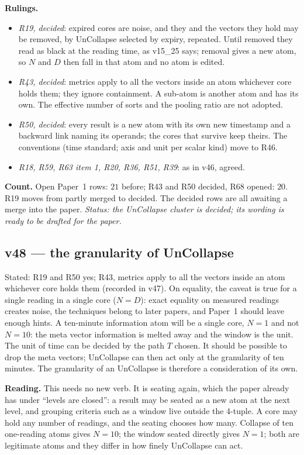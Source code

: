 \documentclass[11pt]{article}
\begin{document}
\textbf{Rulings.}
\begin{itemize}
\item \emph{R19, decided}: expired cores are noise, and they and the vectors they hold may be removed, by UnCollapse selected by expiry, repeated. Until removed they read as black at the reading time, as v15\_25 says; removal gives a new atom, so $N$ and $D$ then fall in that atom and no atom is edited.
\item \emph{R43, decided}: metrics apply to all the vectors inside an atom whichever core holds them; they ignore containment. A sub-atom is another atom and has its own. The effective number of sorts and the pooling ratio are not adopted.
\item \emph{R50, decided}: every result is a new atom with its own new timestamp and a backward link naming its operands; the cores that survive keep theirs. The conventions (time standard; axis and unit per scalar kind) move to R46.
\item \emph{R18, R59, R63 item 1, R20, R36, R51, R39}: as in v46, agreed.
\end{itemize}
\textbf{Count.} Open Paper~1 rows: $21$ before; R43 and R50 decided, R68 opened: $20$. R19 moves from partly merged to decided. The decided rows are all awaiting a merge into the paper.
\emph{Status: the UnCollapse cluster is decided; its wording is ready to be drafted for the paper.}


\subsection*{v48 --- the granularity of UnCollapse}
Stated: R19 and R50 yes; R43, metrics apply to all the vectors inside an atom whichever core holds them (recorded in v47). On equality, the caveat is true for a single reading in a single core ($N=D$): exact
equality on measured readings creates noise, the techniques belong to later papers, and Paper~1 should leave enough hints. A ten-minute information atom will be a single core, $N=1$ and not $N=10$: the
meta vector information is melted away and the window is the unit. The unit of time can be decided by the path $T$ chosen. It should be possible to drop the meta vectors; UnCollapse can then act only at the granularity of ten minutes. The granularity of an UnCollapse is therefore a consideration of its own.

\textbf{Reading.} This needs no new verb. It is seating again, which the paper already has under ``levels are closed'': a result may be seated as a new atom at the next level, and grouping criteria such as a window live outside the 4-tuple. A core may hold any number of readings, and the seating chooses how many.
Collapse of ten one-reading atoms gives $N=10$; the window seated directly gives $N=1$; both are legitimate atoms and they differ in how finely UnCollapse can act.
\end{document}
